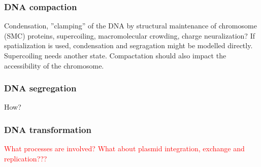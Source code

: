 \subsubsection{DNA compaction}
\textcolor[rgb]{1.00,0.00,0.00}{Condensation, ”clamping” of the DNA by structural maintenance of chromosome (SMC) proteins, supercoiling, macromolecular crowding, charge neuralization?}
If spatialization is used, condensation and segragation might be modelled directly. Supercoiling needs another state.
\textcolor[rgb]{1.00,0.00,0.00}{Compactation should also impact the accessibility of the chromosome.}

\subsubsection{DNA segregation}
\textcolor[rgb]{1.00,0.00,0.00}{How?}
 

\subsubsection{DNA transformation}

\textcolor{red}{What processes are involved?}
\textcolor{red}{What about plasmid integration, exchange and replication???}
